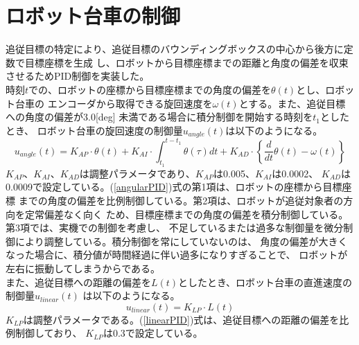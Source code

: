 \section{ロボット台車の制御}
追従目標の特定により、追従目標のバウンディングボックスの中心から後方に定数で目標座標を生成
し、ロボットから目標座標までの距離と角度の偏差を収束させるためPID制御を実装した。 \\ \indent
時刻$t$での、ロボットの座標から目標座標までの角度の偏差を$\theta(t)$とし、ロボット台車の
エンコーダから取得できる旋回速度を$\omega(t)$とする。また、追従目標への角度の偏差が3.0[deg]
未満である場合に積分制御を開始する時刻を$t_1$としたとき、
ロボット台車の旋回速度の制御量$u_{angle}(t)$は以下のようになる。
\begin{equation}
\label{angularPID}
u_{angle}(t) = K_{AP} \cdot \theta(t)+ K_{AI} \cdot \int_{t_1}^{t-t_1} \theta(\tau) dt + K_{AD} \cdot \left\{ \frac{d}{dt} \theta(t) - \omega(t) \right\}
\end{equation}
$K_{AP}$、$K_{AI}$、$K_{AD}$は調整パラメータであり、$K_{AP}$は0.005、$K_{AI}$は0.0002、
$K_{AD}$は0.0009で設定している。(\ref{angularPID})式の第1項は、ロボットの座標から目標座標
までの角度の偏差を比例制御している。第2項は、ロボットが追従対象者の方向を定常偏差なく向く
ため、目標座標までの角度の偏差を積分制御している。第3項では、実機での制御を考慮し、
不足しているまたは過多な制御量を微分制御により調整している。積分制御を常にしていないのは、
角度の偏差が大きくなった場合に、積分値が時間経過に伴い過多になりすぎることで、
ロボットが左右に振動してしまうからである。\\ \indent
また、追従目標への距離の偏差を$L(t)$としたとき、ロボット台車の直進速度の制御量$u_{linear}(t)$
は以下のようになる。
\begin{equation}
\label{linearPID}
u_{linear}(t) = K_{LP} \cdot L(t)
\end{equation}
$K_{LP}$は調整パラメータである。(\ref{linearPID})式は、追従目標への距離の偏差を比例制御しており、
$K_{LP}$は0.3で設定している。

